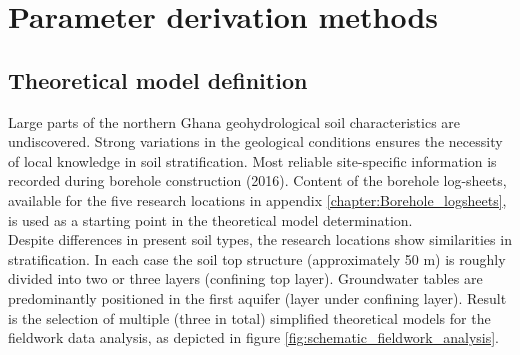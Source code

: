 \section{Parameter derivation methods}
\label{section:derivation_methods}

\subsection{Theoretical model definition}
Large parts of the northern Ghana geohydrological soil characteristics are undiscovered. Strong variations in the geological conditions ensures the necessity of local knowledge in soil stratification. Most reliable site-specific information is recorded during borehole construction (2016). Content of the borehole log-sheets, available for the five research locations in appendix \ref{chapter:Borehole_logsheets}, is used as a starting point in the theoretical model determination. 
\\

Despite differences in present soil types, the research locations show similarities in stratification. In each case the soil top structure (approximately 50 m) is roughly divided into two or three layers (confining top layer). Groundwater tables are predominantly positioned in the first aquifer (layer under confining layer). Result is the selection of multiple (three in total) simplified theoretical models for the fieldwork data analysis, as depicted in figure \ref{fig:schematic_fieldwork_analysis}. 

